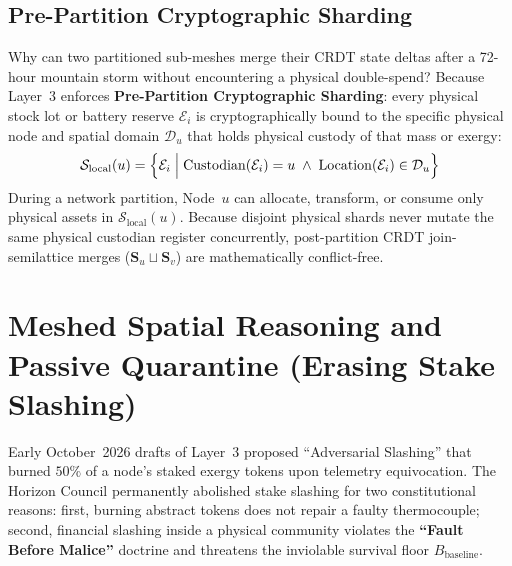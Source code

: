\subsection{Pre-Partition Cryptographic Sharding}
Why can two partitioned sub-meshes merge their CRDT state deltas after a 72-hour mountain storm without encountering a physical double-spend? Because Layer~3 enforces \textbf{Pre-Partition Cryptographic Sharding}: every physical stock lot or battery reserve $\mathcal{E}_i$ is cryptographically bound to the specific physical node and spatial domain $\mathcal{D}_u$ that holds physical custody of that mass or exergy:
\begin{equation}
\mathcal{S}_{\mathrm{local}}(u) = \Bigl\{ \mathcal{E}_i \;\Big|\; \mathrm{Custodian}(\mathcal{E}_i) = u \;\land\; \mathrm{Location}(\mathcal{E}_i) \in \mathcal{D}_u \Bigr\}
\label{eq:ch9-local-shard}
\end{equation}
During a network partition, Node~$u$ can allocate, transform, or consume only physical assets in $\mathcal{S}_{\mathrm{local}}(u)$. Because disjoint physical shards never mutate the same physical custodian register concurrently, post-partition CRDT join-semilattice merges ($\mathbf{S}_u \sqcup \mathbf{S}_v$) are mathematically conflict-free.

\section{Meshed Spatial Reasoning and Passive Quarantine (Erasing Stake Slashing)}
\label{sec:ch9-passive-quarantine}

Early October~2026 drafts of Layer~3 proposed ``Adversarial Slashing'' that burned $50\%$ of a node's staked exergy tokens upon telemetry equivocation. The Horizon Council permanently abolished stake slashing for two constitutional reasons: first, burning abstract tokens does not repair a faulty thermocouple; second, financial slashing inside a physical community violates the \textbf{``Fault Before Malice''} doctrine and threatens the inviolable survival floor $B_{\mathrm{baseline}}$.

